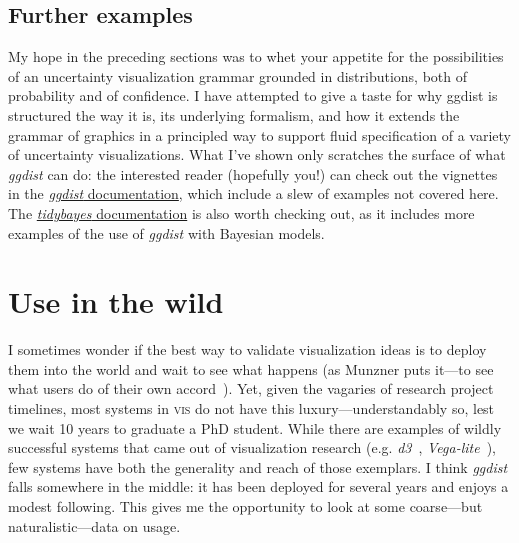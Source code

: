 \documentclass[journal]{vgtc}              %
\begin{document}
\subsection{Further examples}

My hope in the preceding sections was to whet your appetite for the possibilities of an uncertainty visualization grammar grounded in distributions, both of probability and of confidence. I have attempted to give a taste for why ggdist is structured the way it is, its underlying formalism, and how it extends the grammar of graphics in a principled way to support fluid specification of a variety of uncertainty visualizations. What I've shown only scratches the surface of what \textit{ggdist} can do: the interested reader (hopefully you!) can check out the vignettes in the \href{https://mjskay.github.io/ggdist/}{\textit{ggdist} documentation}, which include a slew of examples not covered here. The \href{https://mjskay.github.io/tidybayes/}{\textit{tidybayes} documentation} is also worth checking out, as it includes more examples of the use of \textit{ggdist} with Bayesian models.

\section{Use in the wild}
\label{sec:use-in-the-wild}


I sometimes wonder if the best way to validate visualization ideas is to deploy them into the world and wait to see what happens (as Munzner puts it---to see what users do of their own accord~\cite{munzner2009nested}). Yet, given the vagaries of research project timelines, most systems in \textsc{vis} do not have this luxury---understandably so, lest we wait 10 years to graduate a PhD student. While there are examples of wildly successful systems that came out of visualization research (e.g. \textit{d3}~\cite{bostock2011d3}, \textit{Vega-lite}~\cite{satyanarayan2016vega}), few systems have both the generality and reach of those exemplars. I think \textit{ggdist} falls somewhere in the middle: it has been deployed for several years and enjoys a modest following. This gives me the opportunity to look at some coarse---but naturalistic---data on usage.
\end{document}
